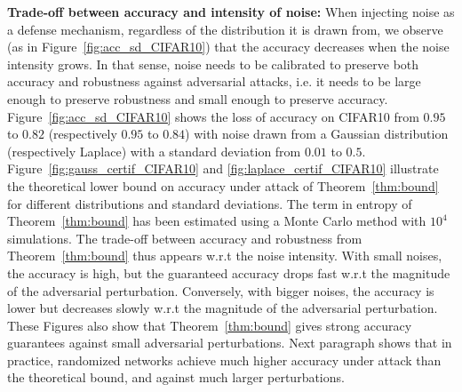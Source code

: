 \textbf{Trade-off between accuracy and intensity of noise:} When injecting noise as a defense mechanism, regardless of the distribution it is drawn from, we observe (as in Figure~\ref{fig:acc_sd_CIFAR10}) that the accuracy decreases when the noise intensity grows. In that sense, noise needs to be calibrated to preserve both accuracy and robustness against adversarial attacks, i.e. it needs to be large enough to preserve robustness and small enough to preserve accuracy. Figure~\ref{fig:acc_sd_CIFAR10} shows the loss of accuracy on CIFAR10 from $0.95$ to $0.82$ (respectively $0.95$ to $0.84$) with noise drawn from a Gaussian distribution (respectively Laplace) with a standard deviation from $0.01$ to $0.5$. Figure~\ref{fig:gauss_certif_CIFAR10} and \ref{fig:laplace_certif_CIFAR10} illustrate the theoretical lower bound on accuracy under attack of Theorem~\ref{thm:bound} for different distributions and standard deviations. The term in entropy of Theorem~\ref{thm:bound} has been estimated using a Monte Carlo method with $10^4$ simulations. The trade-off between accuracy and robustness from Theorem~\ref{thm:bound} thus appears w.r.t the noise intensity. With small noises, the accuracy is high, but the guaranteed accuracy drops fast w.r.t the magnitude of the adversarial perturbation. Conversely, with bigger noises, the accuracy is lower but decreases slowly w.r.t the magnitude of the adversarial perturbation. These Figures also show that Theorem~\ref{thm:bound} gives strong accuracy guarantees against small adversarial perturbations. Next paragraph shows that in practice, randomized networks achieve much higher accuracy under attack than the theoretical bound, and against much larger perturbations.

